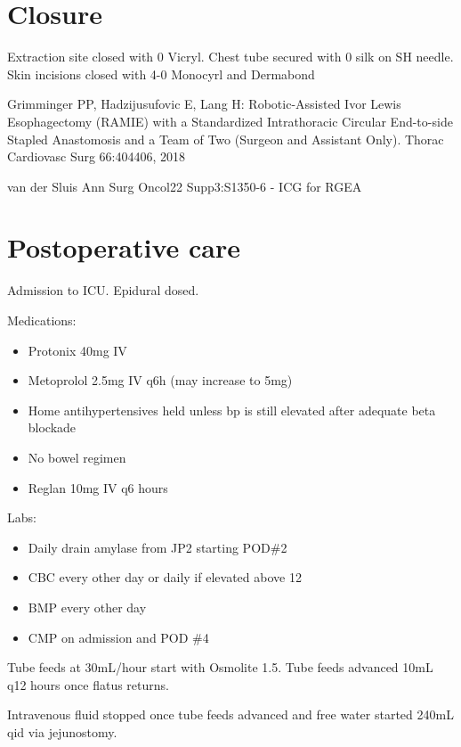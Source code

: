 \documentclass[
  letterpaper,
]{scrbook}
\providecommand{\tightlist}{%
  \setlength{\itemsep}{0pt}\setlength{\parskip}{0pt}}
\begin{document}
\section{Closure}\label{closure-1}

Extraction site closed with 0 Vicryl. Chest tube secured with 0 silk on
SH needle. Skin incisions closed with 4-0 Monocyrl and Dermabond

Grimminger PP, Hadzijusufovic E, Lang H: Robotic-Assisted Ivor Lewis
Esophagectomy (RAMIE) with a Standardized Intrathoracic Circular
End-to-side Stapled Anastomosis and a Team of Two (Surgeon and Assistant
Only). Thorac Cardiovasc Surg 66:404406, 2018

van der Sluis Ann Surg Oncol22 Supp3:S1350-6 - ICG for RGEA

\section{Postoperative care}\label{postoperative-care}

Admission to ICU. Epidural dosed.

Medications:

\begin{itemize}
\tightlist
\item
  Protonix 40mg IV
\item
  Metoprolol 2.5mg IV q6h (may increase to 5mg)
\item
  Home antihypertensives held unless bp is still elevated after adequate
  beta blockade
\item
  No bowel regimen
\item
  Reglan 10mg IV q6 hours
\end{itemize}

Labs:

\begin{itemize}
\tightlist
\item
  Daily drain amylase from JP2 starting POD\#2
\item
  CBC every other day or daily if elevated above 12
\item
  BMP every other day
\item
  CMP on admission and POD \#4
\end{itemize}

Tube feeds at 30mL/hour start with Osmolite 1.5. Tube feeds advanced
10mL q12 hours once flatus returns.

Intravenous fluid stopped once tube feeds advanced and free water
started 240mL qid via jejunostomy.
\end{document}
